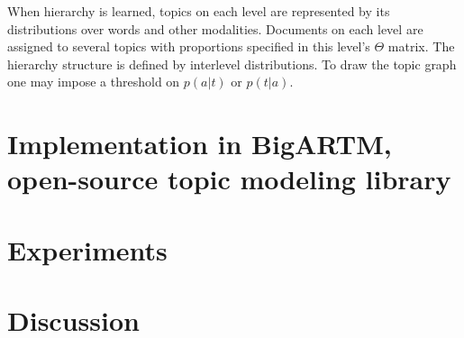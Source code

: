 \documentclass[12pt, twoside]{article}
\begin{document}
When hierarchy is learned, topics on each level are represented by its distributions over words and other modalities. Documents on each level are assigned to several topics with proportions specified in this level's $\Theta$ matrix. The hierarchy structure is defined by interlevel distributions. To draw the topic graph one may impose a threshold on $p(a|t)$ or $p(t|a)$.

\section{Implementation in BigARTM, open-source topic modeling library}
\label{BigARTM} 

\section{Experiments}

\section{Discussion}
\end{document}
